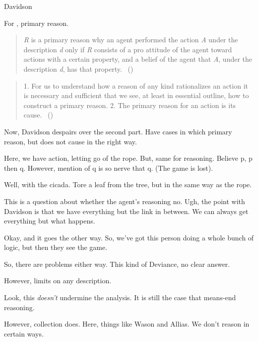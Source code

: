 \begin{note}
  Davidson

  For \citeauthor{Davidson:1963aa}, primary reason.

    \begin{quote}
      \emph{R} is a primary reason why an agent performed the action \emph{A} under the description \emph{d} only if \emph{R} consists of a pro attitude of the agent toward actions with a certain property, and a belief of the agent that \emph{A}, under the description \emph{d}, has that property.\newline
      \mbox{ }\hfill\mbox{(\citeyear[687]{Davidson:1963aa})}
    \end{quote}

  \begin{quote}
    1. For us to understand how a reason of any kind rationalizes an action it is necessary and sufficient that we see, at least in essential outline, how to construct a primary reason.
    2. The primary reason for an action is its cause.%
    \mbox{ }\hfill\mbox{(\citeyear[686]{Davidson:1963aa})}
  \end{quote}

  Now, Davidson despairs over the second part.
  Have cases in which primary reason, but does not cause in the right way.

  Here, we have action, letting go of the rope.
  But, same for reasoning.
  Believe p, p then q.
  However, mention of q is so nerve that q.
  (The game is lost).

  Well, with the cicada.
  Tore a leaf from the tree, but in the same way as the rope.

  This is a question about whether the agent's reasoning no.
  Ugh, the point with Davidson is that we have everything but the link in between.
  We can always get everything but what happens.

  Okay, and it goes the other way.
  So, we've got this person doing a whole bunch of logic, but then they see the game.

  So, there are problems either way.
  This kind of Deviance, no clear answer.

  However, limits on any description.

  Look, this \emph{doesn't} undermine the analysis.
  It is still the case that means-end reasoning.

  However, collection does.
  Here, things like Wason and Allias.
  We don't reason in certain ways.
\end{note}

